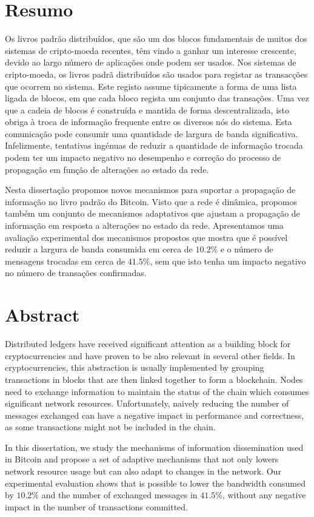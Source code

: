 \chapter*{Resumo}

Os livros padrão distribuídos, que são um dos blocos fundamentais de muitos dos sistemas de cripto-moeda  recentes, têm vindo a ganhar um interesse crescente, devido ao largo número de aplicações onde podem ser usados. Nos sistemas de cripto-moeda, os livros padrã distribuídos são usados para registar as transacções que ocorrem no sistema. Este registo assume tipicamente a forma de uma lista ligada de blocos, em que cada bloco regista um conjunto das transações. Uma vez que a cadeia de blocos é construída e mantida de forma descentralizada, isto obriga à troca de informação frequente entre os diversos nós do sistema. Esta comunicação pode consumir uma quantidade de largura de banda significativa. Infelizmente, tentativas ingénuas de reduzir a quantidade de informação trocada podem ter um impacto negativo no desempenho e correção do processo de propagação em função de alterações ao estado da rede. 

Nesta dissertação propomos novos mecanismos para suportar a propagação de informação no livro padrão do Bitcoin. Visto que a rede é dinâmica, propomos também um conjunto de mecanismos adaptativos que ajustam a propagação de informação em resposta a alterações no estado da rede.   Apresentamos uma avaliação experimental dos mecanismos propostos que mostra que é possível reduzir a largura de banda consumida em cerca de $10.2\%$ e o número de mensagens trocadas em cerca de $41.5\%$, sem que isto tenha um impacto negativo no número de transações confirmadas.

\null\newpage
\chapter*{Abstract}

Distributed ledgers have received significant attention as a building block for cryptocurrencies and have proven to be also relevant in several other fields. In cryptocurrencies, this abstraction is usually implemented by grouping transactions in blocks that are then linked together to form a blockchain. Nodes need to exchange information to maintain the status of the chain which consumes significant network resources. Unfortunately, naively reducing the number of messages exchanged can have a negative impact in performance and correctness, as some transactions might not be included in the chain.

In this dissertation, we study the mechanisms of information dissemination used in Bitcoin and propose a set of adaptive mechanisms that not only lowers network resource usage but can also adapt to changes in the network. Our experimental evaluation shows that is possible to lower the bandwidth consumed by $10.2\%$ and the number of exchanged messages in $41.5\%$, without any negative impact in the number of transactions committed.

\null\newpage
